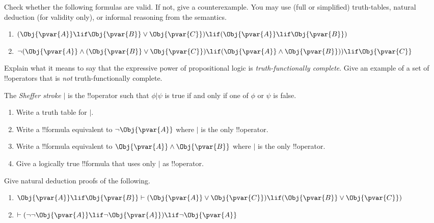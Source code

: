 \documentclass[../../../include/open-logic-section]{subfiles}
\begin{document}


\begin{prob}
    Check whether the following formulas are valid. If not, give a counterexample.
    You may use (full or simplified) truth-tables, natural deduction (for
    validity only), or informal reasoning from the semantics.

    \begin{enumerate}
    \item $(\Obj{\pvar{A}}\lif \Obj{\pvar{B}}\lor \Obj{\pvar{C}})\lif(\Obj{\pvar{A}}\lif \Obj{\pvar{B}})$
    \item $\lnot(\Obj{\pvar{A}}\land(\Obj{\pvar{B}}\lor \Obj{\pvar{C}})\lif(\Obj{\pvar{A}}\land \Obj{\pvar{B}}))\lif \Obj{\pvar{C}}$
    \end{enumerate}
\end{prob}

\begin{prob}
    Explain what it means to say that the expressive power of 
    propositional logic is \emph{truth-functionally complete}.
    Give an example of a set of !!{operator}s that is \emph{not}
    truth-functionally complete.
\end{prob}

\begin{prob}
    The \emph{Sheffer stroke} $|$ is the !!{operator} such
    that $\phi|\psi$ is true if and only if one of $\phi$ or $\psi$ is
    false. 
    \begin{enumerate}
    \item Write a truth table for $|$.
    \item Write a !!{formula} equivalent to $\lnot \Obj{\pvar{A}}$ where $|$ is the only !!{operator}.
    \item Write a !!{formula} equivalent to $\Obj{\pvar{A}}\land \Obj{\pvar{B}}$ where $|$ is the only !!{operator}.
    \item Give a logically true !!{formula} that uses only $|$ as !!{operator}.
    \end{enumerate}
\end{prob}

\begin{prob}
    Give natural deduction proofs of the following.
    \begin{enumerate}
        \item $\Obj{\pvar{A}}\lif \Obj{\pvar{B}}\vdash(\Obj{\pvar{A}}\lor \Obj{\pvar{C}})\lif(\Obj{\pvar{B}}\lor \Obj{\pvar{C}})$
        \item $\vdash(\lnot\lnot \Obj{\pvar{A}}\lif\lnot \Obj{\pvar{A}})\lif\lnot \Obj{\pvar{A}}$
    \end{enumerate}
\end{prob}
\end{document}

